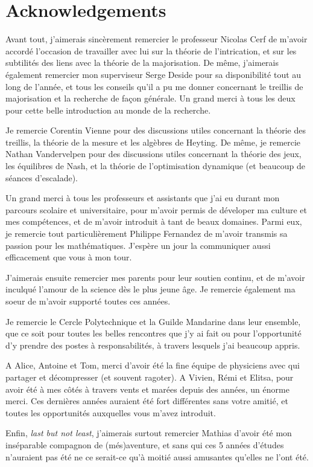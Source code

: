 \section*{Acknowledgements}

Avant tout, j'aimerais sincèrement remercier le professeur Nicolas Cerf de m'avoir accordé l'occasion de travailler avec lui sur la théorie de l'intrication, et sur les subtilités des liens avec la théorie de la majorisation. De même, j'aimerais également remercier mon superviseur Serge Deside pour sa disponibilité tout au long de l'année, et tous les conseils qu'il a pu me donner concernant le treillis de majorisation et la recherche de façon générale. Un grand merci à tous les deux pour cette belle introduction au monde de la recherche. 

Je remercie Corentin Vienne pour des discussions utiles concernant la théorie des treillis, la théorie de la mesure et les algèbres de Heyting. De même, je remercie Nathan Vandervelpen pour des discussions utiles concernant la théorie des jeux, les équilibres de Nash, et la théorie de l'optimisation dynamique (et beaucoup de séances d'escalade).

Un grand merci à tous les professeurs et assistants que j'ai eu durant mon parcours scolaire et universitaire, pour m'avoir permis de déveloper ma culture et mes compétences, et de m'avoir introduit à tant de beaux domaines. Parmi eux, je remercie tout particulièrement Philippe Fernandez de m'avoir transmis sa passion pour les mathématiques. J'espère un jour la communiquer aussi efficacement que vous à mon tour.

J'aimerais ensuite remercier mes parents pour leur soutien continu, et de m'avoir inculqué l'amour de la science dès le plus jeune âge. Je remercie également ma soeur de m'avoir supporté toutes ces années.

Je remercie le Cercle Polytechnique et la Guilde Mandarine dans leur ensemble, que ce soit pour toutes les belles rencontres que j'y ai fait ou pour l'opportunité d'y prendre des postes à responsabilités, à travers lesquels j'ai beaucoup appris.

A Alice, Antoine et Tom, merci d'avoir été la fine équipe de physiciens avec qui partager et décompresser (et souvent ragoter). A Vivien, Rémi et Elitsa, pour avoir été à mes côtés à travers vents et marées depuis des années, un énorme merci. Ces dernières années auraient été fort différentes sans votre amitié, et toutes les opportunités auxquelles vous m'avez introduit.

Enfin, \textit{last but not least}, j'aimerais surtout remercier Mathias d'avoir été mon inséparable compagnon de (més)aventure, et sans qui ces 5 années d'études n'auraient pas été ne ce serait-ce qu'à moitié aussi amusantes qu'elles ne l'ont été.

